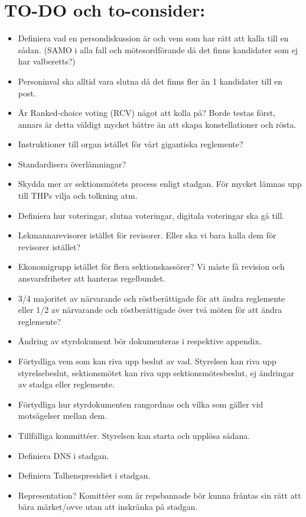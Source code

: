 \documentclass[a4paper]{dtek}
\begin{document}
\section{TO-DO och to-consider:}
\begin{itemize}
  \item Definiera vad en persondiskussion är och vem som har rätt att kalla till en sådan. (SAMO i alla fall och mötesordförande då det finns kandidater som ej har valberetts?)
  \item Personinval ska alltid vara slutna då det finns fler än 1 kandidater till en post.
  \item Är Ranked-choice voting (RCV) något att kolla på? Borde testas först, annars är detta väldigt mycket bättre än att skapa konstellationer och rösta.
  \item Instruktioner till organ istället för vårt gigantiska reglemente?
  \item Standardisera överlämningar?
  \item Skydda mer av sektionsmötets process enligt stadgan. För mycket lämnas upp till THPs vilja och tolkning atm.
  \item Definiera hur voteringar, slutna voteringar, digitala voteringar ska gå till.
  \item Lekmannarevisorer istället för revisorer. Eller ska vi bara kalla dem för revisorer istället?
  \item Ekonomigrupp istället för flera sektionskassörer? Vi måste få revision och ansvarsfriheter att hanteras regelbundet.
  \item 3/4 majoritet av närvarande och röstberättigade för att ändra reglemente eller 1/2 av närvarande och röstberättigade över två möten för att ändra reglemente?
  \item Ändring av styrdokument bör dokumenteras i respektive appendix.
  \item Förtydliga vem som kan riva upp beslut av vad. Styrelsen kan riva upp styrelsebeslut, sektionsmötet kan riva upp sektionsmötesbeslut, ej ändringar av stadga eller reglemente.
  \item Förtydliga hur styrdokumenten rangordnas och vilka som gäller vid motsägelser mellan dem.
  \item Tillfälliga kommittéer. Styrelsen kan starta och upplösa sådana.
  \item Definiera DNS i stadgan.
  \item Definiera Talhenspresidiet i stadgan.
  \item Representation? Komittéer som är repsbannade bör kunna fråntas sin rätt att bära märket/ovve utan att inskränka på stadgan.

\end{itemize}
\end{document}
